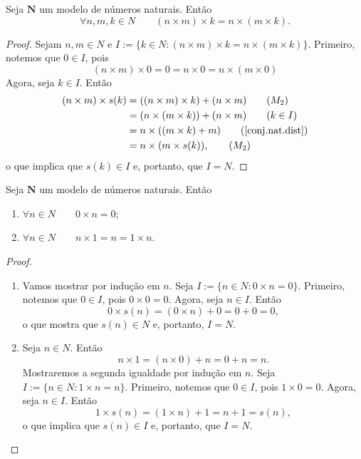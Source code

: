 \begin{teo} \label{conj.nat.ass.mul}
	Seja $\bm N$ um modelo de números naturais. Então
	\begin{equation*}
	\forall n,m,k \in N \qquad (n \times m) \times k = n \times (m \times k).
	\end{equation*}
\end{teo}
\begin{proof}
	Sejam $n,m \in N$ e $I := \{k \in N:(n \times m) \times k = n \times (m \times k)\}$. Primeiro, notemos que $0 \in I$, pois
	\begin{equation*}
	(n \times m) \times 0 = 0 = n \times 0 = n \times (m \times 0) \tag{$M_1$}
	\end{equation*}
Agora, seja $k \in I$. Então
	\begin{align*}
	(n \times m) \times s(k)
		&= ((n \times m) \times k) + (n \times m) 			\tag{$M_2$} \\
		&= (n \times (m \times k)) + (n \times m)			\tag{$k \in I$} \\
		&= n \times ((m \times k) + m)							\tag{$\ref{conj.nat.dist}$} \\
		&= n \times (m \times s(k)),								\tag{$M_2$}
	\end{align*}
o que implica que $s(k) \in I$ e, portanto, que $I=N$.
\end{proof}

\begin{lema} \label{conj.nat.lem.mult}
	Seja $\bm N$ um modelo de números naturais. Então
	\begin{enumerate}
	\item $\forall n \in N \qquad 0 \times n = 0$;
	\item $\forall n \in N \qquad n \times 1 = n = 1 \times n$.
	\end{enumerate}
\end{lema}
\begin{proof}
	\begin{enumerate}
	\item Vamos mostrar por indução em $n$. Seja $I := \{n \in N:0 \times n=0\}$. Primeiro, notemos que $0 \in I$, pois $0 \times 0 = 0$. Agora, seja $n \in I$. Então
	\begin{equation*}
	0 \times s(n) = (0 \times n) + 0 = 0 + 0 = 0,
	\end{equation*}
o que mostra que $s(n) \in N$ e, portanto, $I=N$.
	
	\item Seja $n \in N$. Então
	\begin{equation*}
	n \times 1 = (n \times 0) + n = 0+ n = n.
	\end{equation*}
Mostraremos a segunda igualdade por indução em $n$. Seja $I := \{n \in N:1 \times n = n\}$. Primeiro, notemos que $0 \in I$, pois $1 \times 0 = 0.$ Agora, seja $n \in I$. Então
	\begin{equation*}
	1 \times s(n) = (1 \times n)+1 = n+1=s(n),
	\end{equation*}
o que implica que $s(n) \in I$ e, portanto, que $I=N$.
	\end{enumerate}
\end{proof}

